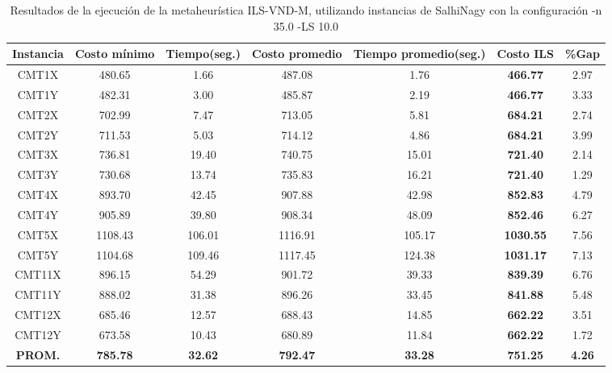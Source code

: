 \begin{table}[h]
\caption{Resultados de la ejecución de la metaheurística ILS-VND-M, utilizando instancias de SalhiNagy con la configuración -n 35.0 -LS 10.0}
\centering
\small
\begin{tabular}{c c c c c c c}
\hline\hline
Instancia & Costo mínimo & Tiempo(seg.) & Costo promedio & Tiempo promedio(seg.) & Costo ILS & \%Gap \\ [0.5ex]
\hline
CMT1X & 480.65 & 1.66 & 
487.08 & 1.76 & \bf{466.77} & 
2.97\\CMT1Y & 482.31 & 3.00 & 
485.87 & 2.19 & \bf{466.77} & 
3.33\\CMT2X & 702.99 & 7.47 & 
713.05 & 5.81 & \bf{684.21} & 
2.74\\CMT2Y & 711.53 & 5.03 & 
714.12 & 4.86 & \bf{684.21} & 
3.99\\CMT3X & 736.81 & 19.40 & 
740.75 & 15.01 & \bf{721.40} & 
2.14\\CMT3Y & 730.68 & 13.74 & 
735.83 & 16.21 & \bf{721.40} & 
1.29\\CMT4X & 893.70 & 42.45 & 
907.88 & 42.98 & \bf{852.83} & 
4.79\\CMT4Y & 905.89 & 39.80 & 
908.34 & 48.09 & \bf{852.46} & 
6.27\\CMT5X & 1108.43 & 106.01 & 
1116.91 & 105.17 & \bf{1030.55} & 
7.56\\CMT5Y & 1104.68 & 109.46 & 
1117.45 & 124.38 & \bf{1031.17} & 
7.13\\CMT11X & 896.15 & 54.29 & 
901.72 & 39.33 & \bf{839.39} & 
6.76\\CMT11Y & 888.02 & 31.38 & 
896.26 & 33.45 & \bf{841.88} & 
5.48\\CMT12X & 685.46 & 12.57 & 
688.43 & 14.85 & \bf{662.22} & 
3.51\\CMT12Y & 673.58 & 10.43 & 
680.89 & 11.84 & \bf{662.22} & 
1.72\\\bf{PROM.} & 
\bf{785.78} & \bf{32.62} & \bf{792.47} & \bf{33.28} & \bf{751.25} & \bf{4.26}\\[1ex]\hline
\end{tabular}
\label{table:ILS-VND-M-35-10-S}
\end{table}

